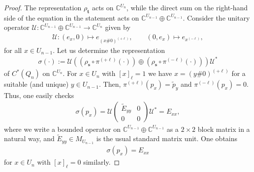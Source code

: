 \documentclass[a4paper]{amsart}
\newcommand{\C}{\mathbb{C}}
\begin{document}
\begin{proof}
    The representation $\rho_\mathbf{t}$ acts on $\C^{U_n}$, while the direct sum on the right-hand side of the equation in the statement acts on $\C^{U_{n-1}} \oplus \C^{U_{n-1}}$. Consider the unitary operator $\mathcal{U}: \C^{U_{n-1}} \oplus \C^{U_{n-1}} \to \C^{U_n}$ given by
    \begin{align*}
        \mathcal{U}: (e_x, 0) \mapsto e_{(x \# 0)^{(+\ell)}}, \qquad
        (0, e_x) \mapsto e_{x^{(-\ell)}},
    \end{align*}
    for all $x \in U_{n-1}$. 
    Let us determine the representation
    \begin{align*}
        \sigma(\cdot) := \mathcal{U} \left(\left(\rho_\mathbf{s} \circ \pi^{(+\ell)}(\cdot)\right) \oplus \left(\rho_\mathbf{s} \circ \pi^{(-\ell)}(\cdot)\right) \right) \mathcal{U}^\ast
    \end{align*}
    of $C^\ast(Q_n)$ on $\C^{U_n}$. For $x \in U_n$ with $[x]_\ell = 1$ we have $x=(y \# 0)^{(+\ell)}$ for a suitable (and unique) $y \in U_{n-1}$. Then, $\pi^{(+\ell)}(p_x) = \tilde{p}_y$ and $\pi^{(-\ell)}(p_x) = 0$. Thus, one easily checks
    \begin{align*}
        \sigma(p_x) = \mathcal{U} \begin{pmatrix}
            \tilde{E}_{yy} & 0 \\
            0      & 0
        \end{pmatrix} \mathcal{U}^\ast = E_{xx},
    \end{align*}
    where we write a bounded operator on $\C^{U_{n-1}} \oplus \C^{U_{n-1}}$ as a $2 \times 2$ block matrix in a natural way, and $\tilde{E}_{yy} \in M_{U_{n-1}}$ is the usual standard matrix unit. One obtains 
    \begin{align*}
        \sigma(p_x) = E_{xx}
    \end{align*}
    for $x \in U_n$ with $[x]_\ell = 0$ similarly.


\end{proof}
\end{document}
